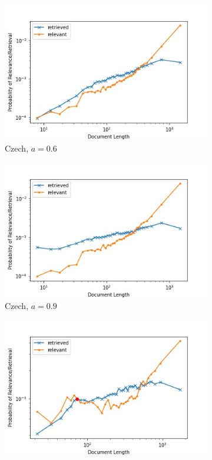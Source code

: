 \documentclass[a4paper]{article}
\begin{document}
\begin{figure}[htpb]
	\centering
	\begin{subfigure}{0.3\textwidth}
		\includegraphics[width=\textwidth]{plot_cs_rel_ret_pivoted0_6.jpg}
		\caption{Czech, $a = 0.6$}
		\label{fig:cs_pivot}
	\end{subfigure}
	\hfill
	\begin{subfigure}{0.3\textwidth}
		\includegraphics[width=\textwidth]{plot_cs_rel_ret_pivoted0_9.jpg}
		\caption{Czech, $a = 0.9$}
		\label{fig:cs_pivot}
	\end{subfigure}
	\hfill
	\begin{subfigure}{0.3\textwidth}
		\includegraphics[width=\textwidth]{plot_en_rel_ret_pivoted.jpg}

\end{subfigure}
\end{figure}
\end{document}

